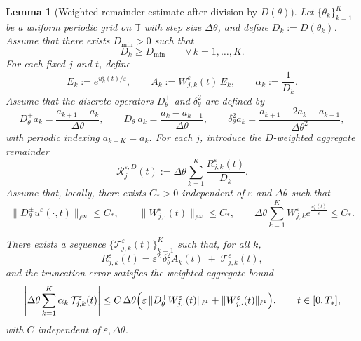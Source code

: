 \documentclass[11pt, dina4, amsfont12]{article}
\newtheorem{lemma}{Lemma}[section]
\begin{document}
\begin{lemma}[Weighted remainder estimate after division by $D(\theta)$]\label{lem:R_est_divD}
Let $\{\theta_k\}_{k=1}^K$ be a uniform periodic grid on $\mathbb T$ with step size $\Delta\theta$,
and define $D_k:=D(\theta_k)$. 
Assume that there exists $D_{\min}>0$ such that
\begin{equation}\label{eq:D_lower}
D_k\ge D_{\min}\qquad \forall\,k=1,\dots,K.
\end{equation}
For each fixed $j$ and $t$, define
\[
E_k := e^{u_k^\varepsilon(t)/\varepsilon},\qquad
A_k := W_{j,k}^\varepsilon(t)\,E_k,\qquad
\alpha_k:=\frac{1}{D_k}.
\]
Assume that the discrete operators
$D_\theta^\pm$ and $\delta_\theta^2$ are defined by
\[
D_\theta^+ a_k=\frac{a_{k+1}-a_k}{\Delta\theta},\qquad
D_\theta^- a_k=\frac{a_k-a_{k-1}}{\Delta\theta},\qquad
\delta_\theta^2 a_k=\frac{a_{k+1}-2a_k+a_{k-1}}{\Delta\theta^2},
\]
with periodic indexing $a_{k+K}=a_k$.
For each $j$, introduce the
$D$-weighted aggregate remainder
\[
\mathcal R_{j}^{\varepsilon,D}(t)
:=\Delta\theta\sum_{k=1}^K \frac{R_{j,k}^\varepsilon(t)}{D_k}.
\]
Assume that, locally, there exists $C_*>0$ independent of $\varepsilon$ and $\Delta\theta$ such that
\begin{equation}\label{eq:apriori_uW}
\|D_\theta^\pm u^\varepsilon(\cdot,t)\|_{\ell^\infty}\le C_*,
\qquad
\|W_{j,\cdot}^\varepsilon(t)\|_{\ell^\infty}\le C_*,
\qquad
\Delta\theta\sum_{k=1}^K W_{j,k}^\varepsilon e^{\frac{u_k^\varepsilon(t)}{\varepsilon}} \le C_* .
\end{equation}

There exists a sequence $\{\mathcal T_{j,k}^\varepsilon(t)\}_{k=1}^K$ such that, for all $k$,
\begin{equation}\label{eq:reduction}
R_{j,k}^\varepsilon(t)=\varepsilon^2\,\delta_\theta^2 A_k(t)\;+\;\mathcal T_{j,k}^\varepsilon(t),
\end{equation}
and the truncation error satisfies the weighted aggregate bound
\begin{equation}\label{eq:trunc_bd}
\left|\Delta\theta\sum_{k=1}^K \alpha_k\,\mathcal T_{j,k}^\varepsilon(t)\right|
\le
C\,\Delta\theta\Bigl(
\varepsilon\,\|D_\theta^+W_{j,\cdot}^\varepsilon(t)\|_{\ell^1}
+
\|W_{j,\cdot}^\varepsilon(t)\|_{\ell^1}
\Bigr),
\qquad t\in[0,T_*],
\end{equation}
with $C$ independent of $\varepsilon,\Delta\theta$.



\end{lemma}
\end{document}
